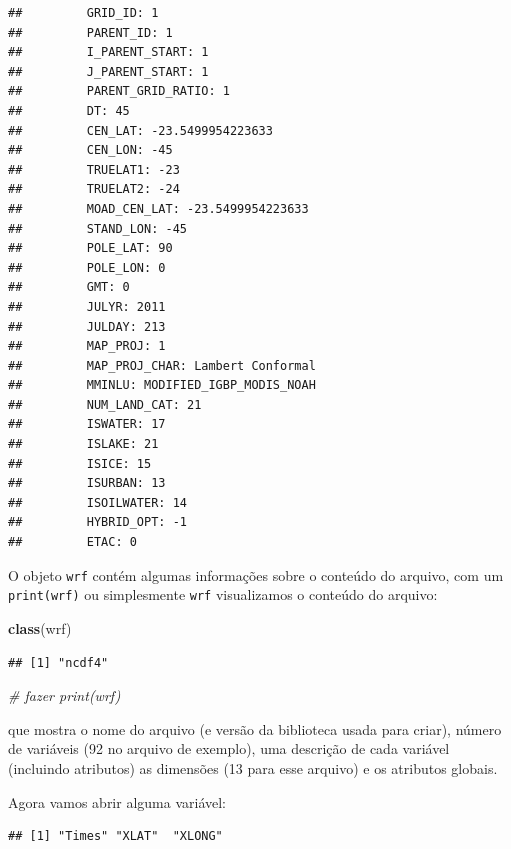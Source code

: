 \documentclass[]{book}
\newenvironment{Shaded}{\begin{snugshade}}{\end{snugshade}}
\newcommand{\KeywordTok}[1]{\textcolor[rgb]{0.13,0.29,0.53}{\textbf{#1}}}
\newcommand{\CommentTok}[1]{\textcolor[rgb]{0.56,0.35,0.01}{\textit{#1}}}
\newcommand{\OperatorTok}[1]{\textcolor[rgb]{0.81,0.36,0.00}{\textbf{#1}}}
\newcommand{\NormalTok}[1]{#1}
\theoremstyle{definition}
\theoremstyle{definition}
\theoremstyle{definition}
\theoremstyle{remark}
\begin{document}
\begin{verbatim}
##         GRID_ID: 1
##         PARENT_ID: 1
##         I_PARENT_START: 1
##         J_PARENT_START: 1
##         PARENT_GRID_RATIO: 1
##         DT: 45
##         CEN_LAT: -23.5499954223633
##         CEN_LON: -45
##         TRUELAT1: -23
##         TRUELAT2: -24
##         MOAD_CEN_LAT: -23.5499954223633
##         STAND_LON: -45
##         POLE_LAT: 90
##         POLE_LON: 0
##         GMT: 0
##         JULYR: 2011
##         JULDAY: 213
##         MAP_PROJ: 1
##         MAP_PROJ_CHAR: Lambert Conformal
##         MMINLU: MODIFIED_IGBP_MODIS_NOAH
##         NUM_LAND_CAT: 21
##         ISWATER: 17
##         ISLAKE: 21
##         ISICE: 15
##         ISURBAN: 13
##         ISOILWATER: 14
##         HYBRID_OPT: -1
##         ETAC: 0
\end{verbatim}

O objeto \texttt{wrf} contém algumas informações sobre o conteúdo do
arquivo, com um \texttt{print(wrf)} ou simplesmente \texttt{wrf}
visualizamos o conteúdo do arquivo:

\begin{Shaded}
\begin{Highlighting}[]
\KeywordTok{class}\NormalTok{(wrf)}
\end{Highlighting}
\end{Shaded}

\begin{verbatim}
## [1] "ncdf4"
\end{verbatim}

\begin{Shaded}
\begin{Highlighting}[]
\CommentTok{# fazer print(wrf)}
\end{Highlighting}
\end{Shaded}

que mostra o nome do arquivo (e versão da biblioteca usada para criar),
número de variáveis (92 no arquivo de exemplo), uma descrição de cada
variável (incluindo atributos) as dimensões (13 para esse arquivo) e os
atributos globais.

Agora vamos abrir alguma variável:

\begin{Shaded}
\end{Shaded}

\begin{verbatim}
## [1] "Times" "XLAT"  "XLONG"
\end{verbatim}
\end{document}
